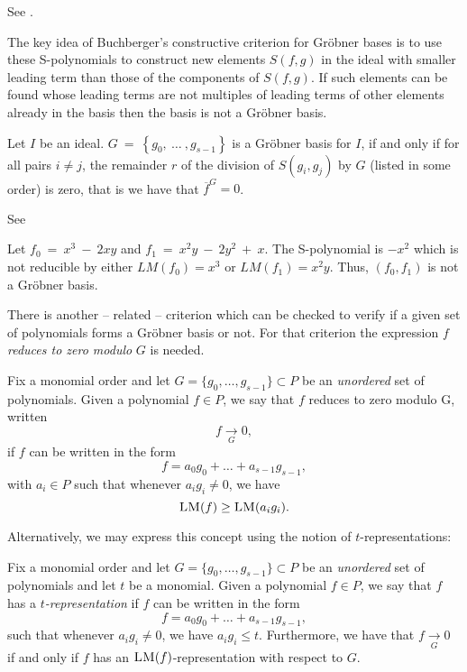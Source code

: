 \begin{citeproof}
See \cite[p.81ff]{Cox2005}.
\end{citeproof}

The key idea of Buchberger's constructive criterion for Gröbner bases is to use these S-polynom\-ials to construct new elements $S(f,g)$ in the ideal with smaller leading term than those of the components of $S(f,g)$. If such elements  can be found whose leading terms are not multiples of leading terms of
other elements already in the basis then the basis is not a Gröbner basis.

\begin{theorem}
\label{theorem:buchberger}
Let $I$ be an ideal. $G\ =\ \left\lbrace g_0,\ \dots\ ,g_{s-1}\right\rbrace$ is
a Gröbner basis for $I$, if and only if for all pairs $i \neq j$, the remainder $r$ of the division of $S(g_i,g_j)$
by $G$ (listed in some order) is zero, that is we have that $\overline{f}^{G} = 0$.
\end{theorem}

\begin{citeproof}
See \cite[p.82ff]{Cox2005}
\end{citeproof}

\begin{example}
Let $f_0\ =\ x^3\ -\ 2xy$ and $f_1\ =\ x^2y\ -\ 2y^2\ +\ x$. The S-polynomial is $-x^2$ which is not reducible by either
$LM(f_0) = x^3$ or $LM(f_1) = x^2y$. Thus, $(f_0,f_1)$ is not a Gröbner basis.
\end{example}

There is another -- related -- criterion which can be checked to verify if a given set of polynomials forms a Gröbner
basis or not. For that criterion the expression $f$ \emph{reduces to zero modulo} $G$ is needed.

\begin{definition}
\cite[p.100]{Cox2005} Fix a monomial order and let $G = \{g_0 ,\dots , g_{s-1} \} \subset P$ be an \emph{unordered} set of polynomials. Given a polynomial $f \in P$, we say that $f$ reduces to zero modulo G, written \[f  \underset{G}{\longrightarrow} 0,\] if $f$ can be written in the form \[f = a_0 g_0 + \dots + a_{s-1} g_{s-1} ,\] with $a_i \in P$ such that whenever $a_i g_i \not= 0$, we have \[\textsc{LM}(f) \geq \textsc{LM}(a_i g_i).\]
\end{definition}

Alternatively, we may express this concept using the notion of $t$-representations:

\begin{definition}[$t$-Representation]
Fix a monomial order and let $G = \{g_0 ,\dots , g_{s-1} \} \subset P$ be an \emph{unordered} set of polynomials and let $t$ be a monomial. Given a polynomial $f \in P$, we say that $f$ has a \emph{$t$-representation}  if $f$ can be written in the form \[f = a_0 g_0 + \dots + a_{s-1} g_{s-1} ,\] such that whenever $a_i g_i \not= 0$, we have  $a_i g_i \leq t.$ Furthermore, we have that $f  \underset{G}{\longrightarrow} 0$ if and only if $f$ has an $\textsc{LM}(f)$-representation with respect to $G$.
\end{definition}

